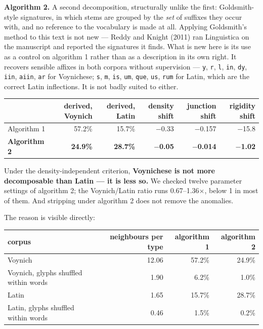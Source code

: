 \documentclass[11pt,a4paper]{article}
\begin{document}
\textbf{Algorithm 2.} A second decomposition, structurally unlike the first: Goldsmith-style signatures, in which stems are grouped by the \emph{set} of suffixes they occur with, and no reference to the vocabulary is made at all. Applying Goldsmith's method to this text is not new --- Reddy and Knight (2011) ran Linguistica on the manuscript and reported the signatures it finds. What is new here is its use as a control on algorithm 1 rather than as a description in its own right. It recovers sensible affixes in both corpora without supervision --- \texttt{y}, \texttt{r}, \texttt{l}, \texttt{in}, \texttt{dy}, \texttt{iin}, \texttt{aiin}, \texttt{ar} for Voynichese; \texttt{s}, \texttt{m}, \texttt{is}, \texttt{um}, \texttt{que}, \texttt{us}, \texttt{rum} for Latin, which are the correct Latin inflections. It is not badly suited to either.


\begin{table}[htbp]\centering\small
\begin{tabular}{@{}lrrrrr@{}}
\toprule
 & derived, Voynich & derived, Latin & density shift & junction shift & rigidity shift \\
\midrule
Algorithm 1 & 57.2\% & 15.7\% & $-$0.33 & $-$0.157 & $-$15.8 \\
\textbf{Algorithm 2} & \textbf{24.9\%} & \textbf{28.7\%} & \textbf{$-$0.05} & \textbf{$-$0.014} & \textbf{$-$1.02} \\
\bottomrule
\end{tabular}
\end{table}


Under the density-independent criterion, \textbf{Voynichese is not more decomposable than Latin --- it is less so.} We checked twelve parameter settings of algorithm 2; the Voynich/Latin ratio runs 0.67--1.36$\times$, below 1 in most of them. And stripping under algorithm 2 does not remove the anomalies.


The reason is visible directly:


\begin{table}[htbp]\centering\small
\begin{tabular}{@{}lrrr@{}}
\toprule
corpus & neighbours per type & algorithm 1 & algorithm 2 \\
\midrule
Voynich & 12.06 & 57.2\% & 24.9\% \\
Voynich, glyphs shuffled within words & 1.90 & 6.2\% & 1.0\% \\
Latin & 1.65 & 15.7\% & 28.7\% \\
Latin, glyphs shuffled within words & 0.46 & 1.5\% & 0.2\% \\
\bottomrule
\end{tabular}
\end{table}
\end{document}
